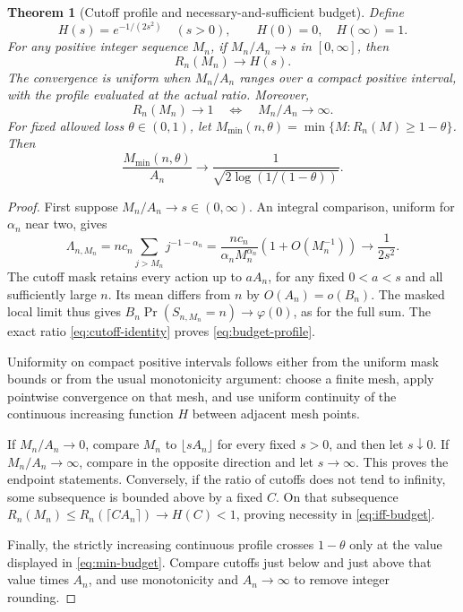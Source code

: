 \documentclass[11pt,a4paper]{article}
\numberwithin{equation}{section}
\newtheorem{theorem}{Theorem}[section]
\theoremstyle{definition}
\theoremstyle{remark}
\newcommand{\ph}{\varphi}
\begin{document}
\begin{theorem}[Cutoff profile and necessary-and-sufficient budget]
\label{thm:budget}
Define
\begin{equation}
 H(s)=e^{-1/(2s^2)}\quad(s>0),\qquad H(0)=0,\quad H(\infty)=1.
 \label{eq:H-profile}
\end{equation}
For any positive integer sequence \(M_n\), if \(M_n/A_n\to s\) in
\([0,\infty]\), then
\begin{equation}
 R_n(M_n)\longrightarrow H(s).
 \label{eq:budget-profile}
\end{equation}
The convergence is uniform when \(M_n/A_n\) ranges over a compact positive
interval, with the profile evaluated at the actual ratio. Moreover,
\begin{equation}
 R_n(M_n)\to1\quad\Longleftrightarrow\quad M_n/A_n\to\infty.
 \label{eq:iff-budget}
\end{equation}
For fixed allowed loss \(\theta\in(0,1)\), let
\(M_{\min}(n,\theta)=\min\{M:R_n(M)\ge1-\theta\}\). Then
\begin{equation}
 \frac{M_{\min}(n,\theta)}{A_n}\longrightarrow
 \frac1{\sqrt{2\log(1/(1-\theta))}}.
 \label{eq:min-budget}
\end{equation}
\end{theorem}
\begin{proof}
First suppose \(M_n/A_n\to s\in(0,\infty)\). An integral comparison, uniform
for \(\alpha_n\) near two, gives
\begin{equation}
 \Lambda_{n,M_n}=nc_n\sum_{j>M_n}j^{-1-\alpha_n}
 =\frac{nc_n}{\alpha_nM_n^{\alpha_n}}(1+O(M_n^{-1}))
 \longrightarrow\frac1{2s^2}.
 \label{eq:lambda-limit}
\end{equation}
The cutoff mask retains every action up to \(aA_n\), for any fixed
\(0<a<s\) and all sufficiently large \(n\). Its mean differs from \(n\) by
\(O(A_n)=o(B_n)\). The masked local limit thus gives
\(B_n\Pr(S_{n,M_n}=n)\to\ph(0)\), as for the full sum. The exact ratio
\eqref{eq:cutoff-identity} proves \eqref{eq:budget-profile}.

Uniformity on compact positive intervals follows either from the uniform
mask bounds or from the usual monotonicity argument: choose a finite mesh,
apply pointwise convergence on that mesh, and use uniform continuity of the
continuous increasing function \(H\) between adjacent mesh points.

If \(M_n/A_n\to0\), compare \(M_n\) to \(\lfloor sA_n\rfloor\) for every
fixed \(s>0\), and then let \(s\downarrow0\). If \(M_n/A_n\to\infty\),
compare in the opposite direction and let \(s\to\infty\). This proves the
endpoint statements. Conversely, if the ratio of cutoffs does not tend to
infinity, some subsequence is bounded above by a fixed \(C\). On that
subsequence \(R_n(M_n)\le R_n(\lceil CA_n\rceil)\to H(C)<1\), proving
necessity in \eqref{eq:iff-budget}.

Finally, the strictly increasing continuous profile crosses \(1-\theta\)
only at the value displayed in \eqref{eq:min-budget}. Compare cutoffs just
below and just above that value times \(A_n\), and use monotonicity and
\(A_n\to\infty\) to remove integer rounding.
\end{proof}
\end{document}
